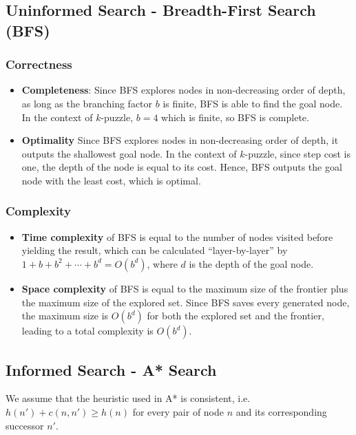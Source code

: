 \documentclass{llncs}
\begin{document}
\subsection{Uninformed Search - Breadth-First Search (BFS)}
\subsubsection{Correctness}
\begin{itemize}
	\item[] \textbf{Completeness}:
	Since BFS explores nodes in non-decreasing order of depth, as long as the branching factor $b$ is finite, BFS is able to find the goal node. In the context of $k$-puzzle, $b=4$ which is finite, so BFS is complete.
	\item[] \textbf{Optimality}
	Since BFS explores nodes in non-decreasing order of depth, it outputs the shallowest goal node. In the context of $k$-puzzle, since step cost is one, the depth of the node is equal to its cost. Hence, BFS outputs the goal node with the least cost, which is optimal.
\end{itemize}
\subsubsection{Complexity}
\begin{itemize}
	\item[] \textbf{Time complexity} of BFS is equal to the number of nodes visited before yielding the result, which can be calculated “layer-by-layer” by $1+b+b^2+\cdots +b^d = O(b^d)$, where $d$ is the depth of the goal node.
	\item[] \textbf{Space complexity} of BFS is equal to the maximum size of the frontier plus the maximum size of the explored set. Since BFS saves every generated node, the maximum size is $O(b^d)$ for both the explored set and the frontier, leading to a total complexity is $O(b^d)$.
\end{itemize}

\subsection{Informed Search - A* Search}
We assume that the heuristic used in A* is consistent, i.e. $h(n')+c(n,n') \geq h(n)$ for every pair of node $n$ and its corresponding successor $n'$.
\end{document}

